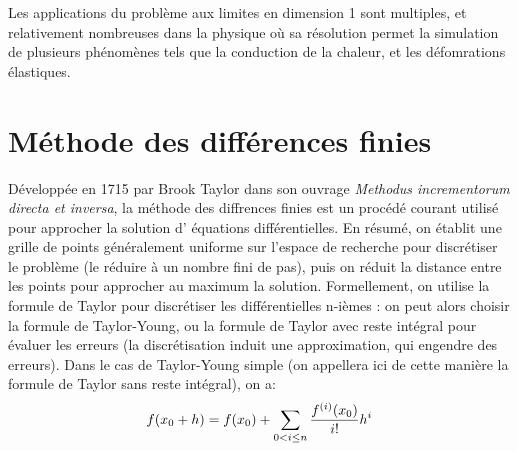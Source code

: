 \documentclass[11pt]{article}
\begin{document}
Les applications du problème aux limites en dimension 1 sont multiples, et relativement nombreuses dans la physique où sa résolution permet la simulation de plusieurs phénomènes tels que la conduction de la chaleur, et les défomrations élastiques.



\section{Méthode des différences finies}

\quad Développée en 1715 par Brook Taylor dans son ouvrage \emph{Methodus incrementorum directa et inversa}, la méthode des diffrences finies est un procédé courant utilisé pour approcher la solution d' équations différentielles. En résumé, on établit une grille de points généralement uniforme sur l'espace de recherche pour discrétiser le problème (le réduire à un nombre fini de pas), puis on réduit la distance entre les points pour approcher au maximum la solution.
\quad Formellement, on utilise la formule de Taylor pour discrétiser les différentielles n-ièmes : on peut alors choisir la formule de Taylor-Young, ou la formule de Taylor avec reste intégral pour évaluer les erreurs (la discrétisation induit une approximation, qui engendre des erreurs).
Dans le cas de Taylor-Young simple (on appellera ici de cette manière la formule de Taylor sans reste intégral), on a:
$$
f\relax(x_0 + h) = f\relax(x_0) + \sum_{\substack{0<i\le n}}\frac{f^{(i)}\relax(x_0)}{i!}h^i
$$ 
\end{document}
